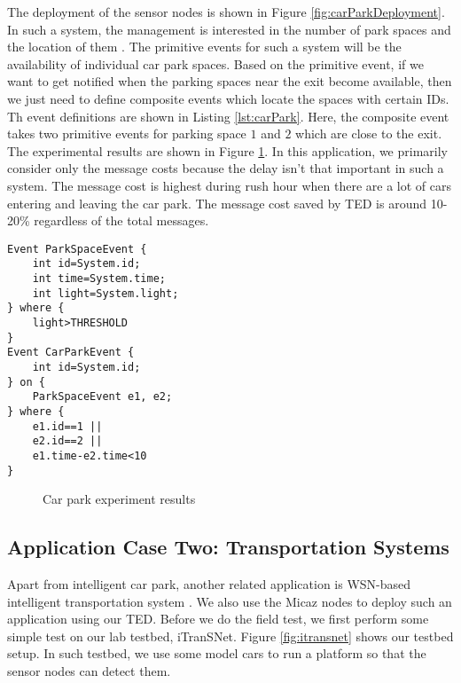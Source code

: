 The deployment of the sensor nodes is shown in Figure \ref{fig:carParkDeployment}. In such a system, the management is interested in the number of park spaces and the location of them \cite{tang:carpark}. The primitive events for such a system will be the availability of individual car park spaces. Based on the primitive event, if we want to get notified when the parking spaces near the exit become available, then we just need to define composite events which locate the spaces with certain IDs. Th event definitions are shown in Listing \ref{lst:carPark}. Here, the composite event takes two primitive events for parking space \(1\) and \(2\) which are close to the exit. The experimental results are shown in Figure \ref{fig:carParkResults}. In this application, we primarily consider only the message costs because the delay isn't that important in such a system. The message cost is highest during rush hour when there are a lot of cars entering and leaving the car park. The message cost saved by TED is around 10-20\% regardless of the total messages.

\begin{lstlisting}[caption=Event definition for a car park, label=lst:carPark]
Event ParkSpaceEvent {
	int id=System.id;
	int time=System.time;
	int light=System.light;
} where {
	light>THRESHOLD
}
Event CarParkEvent {
	int id=System.id;
} on {
	ParkSpaceEvent e1, e2;
} where {
	e1.id==1 ||
	e2.id==2 ||
	e1.time-e2.time<10
}
\end{lstlisting}

\begin{figure}
\centering
{}
\caption{Car park experiment results}
\label{fig:carParkResults}
\end{figure}

\subsection{Application Case Two: Transportation Systems}
Apart from intelligent car park, another related application is WSN-based intelligent transportation system \cite{lai:its}. We also use the Micaz nodes to deploy such an application using our TED. Before we do the field test, we first perform some simple test on our lab testbed, iTranSNet. Figure \ref{fig:itransnet} shows our testbed setup. In such testbed, we use some model cars to run a platform so that the sensor nodes can detect them.

